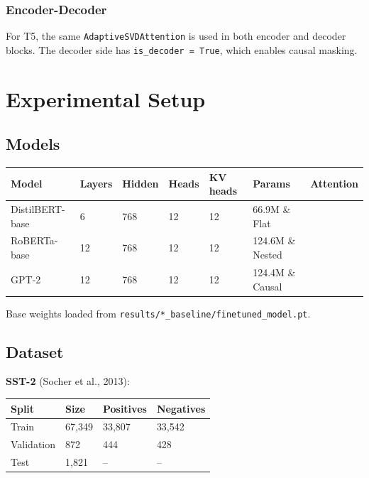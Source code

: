 \subsubsection{Encoder-Decoder}

For T5, the same \texttt{AdaptiveSVDAttention} is used in both encoder and decoder 
blocks. The decoder side has \texttt{is\_decoder = True}, which enables causal masking.


\section{Experimental Setup}

\subsection{Models}

\begin{table}[H]
\centering
\small
\begin{tabular}{lllllll}
\toprule
\textbf{Model} & \textbf{Layers} & \textbf{Hidden} & \textbf{Heads} & \textbf{KV heads} & \textbf{Params} & \textbf{Attention} \\
\midrule
DistilBERT-base & 6 & 768 & 12 & 12 & 66.9M \& Flat \\
RoBERTa-base & 12 & 768 & 12 & 12 & 124.6M \& Nested \\
GPT-2 & 12 & 768 & 12 & 12 & 124.4M \& Causal \\
\bottomrule
\end{tabular}
\end{table}

Base weights loaded from \texttt{results/*\_baseline/finetuned\_model.pt}.

\subsection{Dataset}

\textbf{SST-2} (Socher et al., 2013):

\begin{table}[H]
\centering
\small
\begin{tabular}{llll}
\toprule
\textbf{Split} & \textbf{Size} & \textbf{Positives} & \textbf{Negatives} \\
\midrule
Train & 67,349 & 33,807 & 33,542 \\
Validation & 872 & 444 & 428 \\
Test & 1,821 & -- & -- \\
\bottomrule
\end{tabular}
\end{table}

